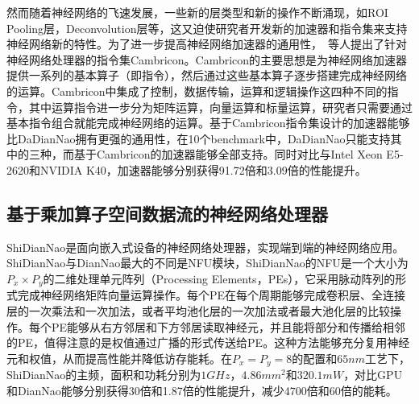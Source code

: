 然而随着神经网络的飞速发展，一些新的层类型和新的操作不断涌现，如ROI Pooling层，Deconvolution层等，这又迫使研究者开发新的加速器和指令集来支持神经网络新的特性。为了进一步提高神经网络加速器的通用性，~\citet{liu2016cambricon}等人提出了针对神经网络处理器的指令集Cambricon。Cambricon的主要思想是为神经网络加速器提供一系列的基本算子（即指令），然后通过这些基本算子逐步搭建完成神经网络的运算。Cambricon中集成了控制，数据传输，运算和逻辑操作这四种不同的指令，其中运算指令进一步分为矩阵运算，向量运算和标量运算，研究者只需要通过基本指令组合就能完成神经网络的运算。基于Cambricon指令集设计的加速器能够比DaDianNao拥有更强的通用性，在10个benchmark中，DaDianNao只能支持其中的三种，而基于Cambricon的加速器能够全部支持。同时对比与Intel Xeon E5-2620和NVIDIA K40，加速器能够分别获得91.72倍和3.09倍的性能提升。

\subsection{基于乘加算子空间数据流的神经网络处理器}
ShiDianNao是面向嵌入式设备的神经网络处理器，实现端到端的神经网络应用。ShiDianNao与DianNao最大的不同是NFU模块，ShiDianNao的NFU是一个大小为$P_x\times P_y$的二维处理单元阵列（Processing Elements，PEs），它采用脉动阵列的形式完成神经网络矩阵向量运算操作。每个PE在每个周期能够完成卷积层、全连接层的一次乘法和一次加法，或者平均池化层的一次加法或者最大池化层的比较操作。每个PE能够从右方邻居和下方邻居读取神经元，并且能将部分和传播给相邻的PE，值得注意的是权值通过广播的形式传送给PE。这种方法能够充分复用神经元和权值，从而提高性能并降低访存能耗。在$P_x=P_y=8$的配置和$65nm$工艺下，ShiDianNao的主频，面积和功耗分别为$1GHz$，$4.86mm^2$和$320.1mW$，对比GPU和DianNao能够分别获得30倍和1.87倍的性能提升，减少4700倍和60倍的能耗。


